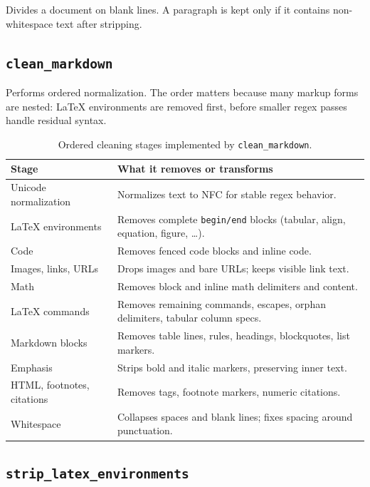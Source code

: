 \documentclass[12pt,a4paper]{article}
\begin{document}
Divides a document on blank lines. A paragraph is kept only if it contains non-whitespace text after stripping.

\subsection{\texttt{clean\_markdown}}

Performs ordered normalization. The order matters because many markup forms are nested: LaTeX environments are removed first, before smaller regex passes handle residual syntax.

\begin{table}[H]
\centering
\caption{Ordered cleaning stages implemented by \texttt{clean\_markdown}.}
\label{tab:clean-stages}
\renewcommand{\arraystretch}{1.25}
\begin{tabularx}{\linewidth}{lX}
\toprule
\textbf{Stage} & \textbf{What it removes or transforms} \\
\midrule
Unicode normalization  & Normalizes text to NFC for stable regex behavior. \\
LaTeX environments     & Removes complete \texttt{begin/end} blocks (tabular, align, equation, figure, …). \\
Code                   & Removes fenced code blocks and inline code. \\
Images, links, URLs    & Drops images and bare URLs; keeps visible link text. \\
Math                   & Removes block and inline math delimiters and content. \\
LaTeX commands         & Removes remaining commands, escapes, orphan delimiters, tabular column specs. \\
Markdown blocks        & Removes table lines, rules, headings, blockquotes, list markers. \\
Emphasis               & Strips bold and italic markers, preserving inner text. \\
HTML, footnotes, citations & Removes tags, footnote markers, numeric citations. \\
Whitespace             & Collapses spaces and blank lines; fixes spacing around punctuation. \\
\bottomrule
\end{tabularx}
\end{table}

\subsection{\texttt{strip\_latex\_environments}}
\end{document}
